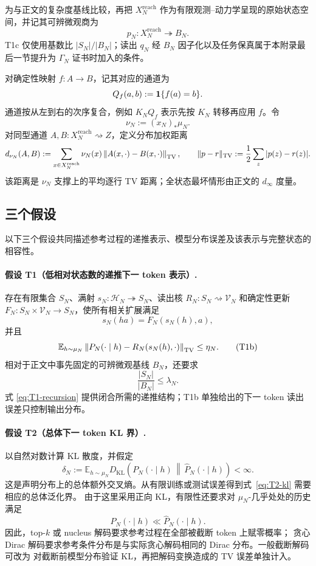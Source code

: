 为与正文的复杂度基线比较，再把 $X_N^{\mathrm{reach}}$ 作为有限观测--动力学呈现的原始状态空间，并记其可辨微观商为
\[
 p_N:X_N^{\mathrm{reach}}\twoheadrightarrow B_N.
\]
T1c 仅使用基数比 $|S_N|/|B_N|$；读出 $q_N$ 经 $B_N$ 因子化以及任务保真属于本附录最后一节提升为 $\Gamma_N$ 证书时加入的条件。

对确定性映射 $f:A\to B$，记其对应的通道为
\[
 Q_f(a,b):=\mathbf 1\{f(a)=b\}.
\]
通道按从左到右的次序复合，例如 $K_NQ_f$ 表示先按 $K_N$ 转移再应用 $f$。令
\[
 \nu_N:=(x_N)_*\mu_N.
\]
对同型通道 $A,B:X_N^{\mathrm{reach}}\rightsquigarrow Z$，定义分布加权距离
\[
 d_{\nu_N}(A,B)
 :=\sum_{x\in X_N^{\mathrm{reach}}}\nu_N(x)
   \left\|A(x,\cdot)-B(x,\cdot)\right\|_{\operatorname{TV}},
 \qquad
 \|p-r\|_{\operatorname{TV}}:=\frac12\sum_z|p(z)-r(z)|.
\]
该距离是 $\nu_N$ 支撑上的平均逐行 TV 距离；全状态最坏情形由正文的 $d_\infty$ 度量。

\subsection{三个假设}

以下三个假设共同描述参考过程的递推表示、模型分布误差及该表示与完整状态的相容性。

\paragraph{假设 T1（低相对状态数的递推下一 token 表示）.}
存在有限集合 $S_N$、满射 $s_N:\mathcal H_N\twoheadrightarrow S_N$、读出核
$R_N:S_N\rightsquigarrow\mathcal V_N$ 和确定性更新
$F_N:S_N\times\mathcal V_N\to S_N$，使所有相关扩展满足
\[
 s_N(ha)=F_N(s_N(h),a),
 \tag{T1a}\label{eq:T1-recursion}
\]
并且
\[
 \mathbb E_{h\sim\mu_N}
 \left\|P_N(\cdot\mid h)-R_N(s_N(h),\cdot)\right\|_{\operatorname{TV}}
 \le \eta_N.
 \tag{T1b}\label{eq:T1-readout}
\]
相对于正文中事先固定的可辨微观基线 $B_N$，还要求
\[
 \frac{|S_N|}{|B_N|}\le\lambda_N.
 \tag{T1c}\label{eq:T1-complexity}
\]
式 \eqref{eq:T1-recursion} 提供闭合所需的递推结构；T1b 单独给出的下一 token 读出误差只控制输出分布。

\paragraph{假设 T2（总体下一 token KL 界）.}
以自然对数计算 KL 散度，并假定
\[
 \delta_N
 :=\mathbb E_{h\sim\mu_N}
 D_{\mathrm{KL}}\!\left(
 P_N(\cdot\mid h)\,\middle\|\,
 \widehat P_N(\cdot\mid h)
 \right)<\infty.
 \tag{T2}\label{eq:T2-kl}
\]
这是声明分布上的总体额外交叉熵。从有限训练或测试误差得到式~\eqref{eq:T2-kl} 需要相应的总体泛化界。
由于这里采用正向 KL，有限性还要求对 $\mu_N$-几乎处处的历史满足
\[
 P_N(\cdot\mid h)\ll\widehat P_N(\cdot\mid h).
\]
因此，top-$k$ 或 nucleus 解码要求参考过程在全部被截断 token 上赋零概率；
贪心 Dirac 解码要求参考条件分布是与实际贪心解码相同的 Dirac 分布。一般截断解码可改为
对截断前模型分布验证 KL，再把解码变换造成的 TV 误差单独计入。

